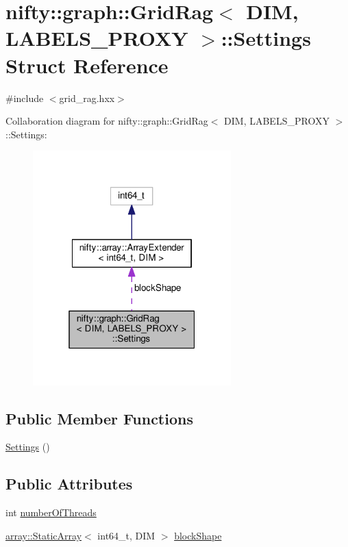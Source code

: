 \hypertarget{structnifty_1_1graph_1_1GridRag_1_1Settings}{}\section{nifty\+:\+:graph\+:\+:Grid\+Rag$<$ D\+I\+M, L\+A\+B\+E\+L\+S\+\_\+\+P\+R\+O\+X\+Y $>$\+:\+:Settings Struct Reference}
\label{structnifty_1_1graph_1_1GridRag_1_1Settings}


{\ttfamily \#include $<$grid\+\_\+rag.\+hxx$>$}



Collaboration diagram for nifty\+:\+:graph\+:\+:Grid\+Rag$<$ D\+I\+M, L\+A\+B\+E\+L\+S\+\_\+\+P\+R\+O\+X\+Y $>$\+:\+:Settings\+:\nopagebreak
\begin{figure}[H]
\begin{center}
\leavevmode
\includegraphics[width=217pt]{structnifty_1_1graph_1_1GridRag_1_1Settings__coll__graph}
\end{center}
\end{figure}
\subsection*{Public Member Functions}
\begin{DoxyCompactItemize}
\item 
\hyperlink{structnifty_1_1graph_1_1GridRag_1_1Settings_ab74b42adb3edae11a0a9de5f761467f8}{Settings} ()
\end{DoxyCompactItemize}
\subsection*{Public Attributes}
\begin{DoxyCompactItemize}
\item 
int \hyperlink{structnifty_1_1graph_1_1GridRag_1_1Settings_ac1e055fb552015ad19a2686e93e83436}{number\+Of\+Threads}
\item 
\hyperlink{namespacenifty_1_1array_a683f151f19c851754e0c6d55ed16a0c2}{array\+::\+Static\+Array}$<$ int64\+\_\+t, D\+I\+M $>$ \hyperlink{structnifty_1_1graph_1_1GridRag_1_1Settings_aaec8f76fa3dd464478f2dbefbbd6aeac}{block\+Shape}
\end{DoxyCompactItemize}


